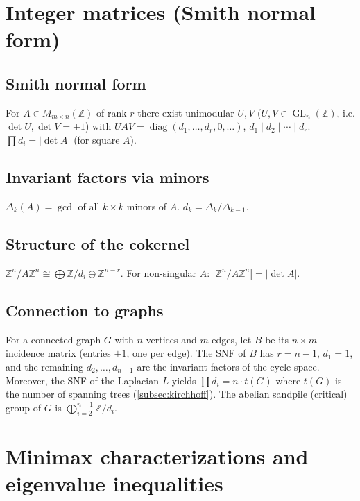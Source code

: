 \medskip

\section{Integer matrices (Smith normal form)}
\label{sec:snf}

\subsection{Smith normal form}
\label{subsec:snf}

For $A\in M_{m\times n}(\mathbb{Z})$ of rank $r$ there exist unimodular $U,V$ ($U,V\in\operatorname{GL}_n(\mathbb{Z})$, i.e. $\det U,\det V=\pm1$) with $UAV=\operatorname{diag}(d_1,\dots,d_r,0,\dots)$, $d_1\mid d_2\mid\cdots\mid d_r$. $\prod d_i=|\det A|$ (for square $A$).

\subsection{Invariant factors via minors}
\label{subsec:invariant-factors}

$\Delta_k(A)=\gcd$ of all $k\times k$ minors of $A$. $d_k=\Delta_k/\Delta_{k-1}$.

\subsection{Structure of the cokernel}
\label{subsec:cokernel-structure}

$\mathbb{Z}^n/A\mathbb{Z}^n\cong\bigoplus\mathbb{Z}/d_i\oplus\mathbb{Z}^{n-r}$. For non-singular $A$: $|\mathbb{Z}^n/A\mathbb{Z}^n|=|\det A|$.

\subsection{Connection to graphs}
\label{subsec:snf-graphs}

For a connected graph $G$ with $n$ vertices and $m$ edges, let $B$ be its $n\times m$ incidence matrix (entries $\pm1$, one per edge). The SNF of $B$ has $r=n-1$, $d_1=1$, and the remaining $d_2,\dots,d_{n-1}$ are the invariant factors of the cycle space. Moreover, the SNF of the Laplacian $L$ yields $\prod d_i = n\cdot t(G)$ where $t(G)$ is the number of spanning trees (\ref{subsec:kirchhoff}). The abelian sandpile (critical) group of $G$ is $\bigoplus_{i=2}^{n-1}\mathbb Z/d_i$.

\medskip

\section{Minimax characterizations and eigenvalue inequalities}
\label{sec:minimax}

